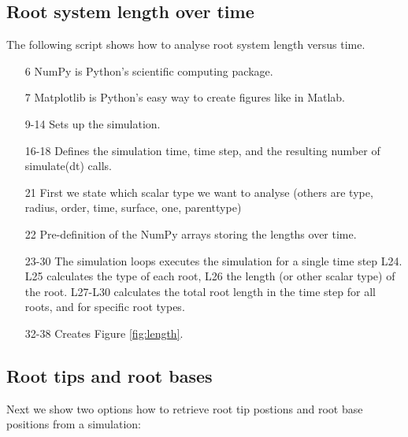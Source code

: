 \subsection{Root system length over time}

The following script shows how to analyse root system length versus time. 



\begin{itemize}

\item[6] NumPy is Python's scientific computing package.
\item[7] Matplotlib is Python's easy way to create figures like in Matlab.

\item[9-14] Sets up the simulation.

\item[16-18] Defines the simulation time, time step, and the resulting number of simulate(dt) calls. 

\item[21] First we state which scalar type we want to analyse (others are type, radius, order, time, surface, one, parenttype)

\item[22] Pre-definition of the NumPy arrays storing the lengths over time. 

\item[23-30] The simulation loops executes the simulation for a single time step L24. L25 calculates the type of each root, L26 the length (or other scalar type) of the root. L27-L30 calculates the total root length in the time step for all roots, and for specific root types.

\item[32-38] Creates Figure \ref{fig:length}.

\end{itemize}



\subsection{Root tips and root bases}

Next we show two options how to retrieve root tip postions and root base positions from a simulation:



